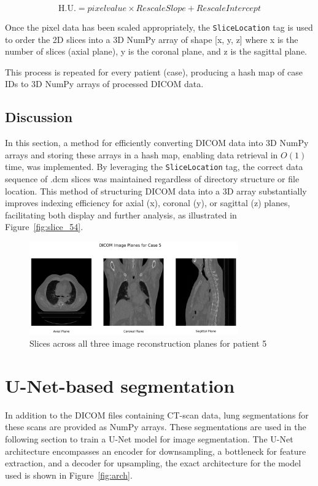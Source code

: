 \documentclass[12pt]{report}
\begin{document}
\begin{equation}
    \text{H.U.} = pixel value \times RescaleSlope + RescaleIntercept
    \label{eq:hu}
\end{equation}

Once the pixel data has been scaled appropriately, the \verb|SliceLocation| tag is used to order the 2D slices into a 3D NumPy array of shape [x, y, z] where x is the number of slices (axial plane), y is the coronal plane, and z is the sagittal plane.

This process is repeated for every patient (case), producing a hash map of case IDs to 3D NumPy arrays of processed DICOM data.


\section{Discussion}

In this section, a method for efficiently converting DICOM data into 3D NumPy arrays and storing these arrays in a hash map, enabling data retrieval in $O(1)$ time, was implemented. By leveraging the \texttt{SliceLocation} tag, the correct data sequence of .dcm slices was maintained regardless of directory structure or file location. This method of structuring DICOM data into a 3D array substantially improves indexing efficiency for axial (x), coronal (y), or sagittal (z) planes, facilitating both display and further analysis, as illustrated in Figure~\ref{fig:slice_54}.

\begin{figure}[ht]
    \centering
    \includegraphics[width=0.8\textwidth]{planes.png}
    \caption{Slices across all three image reconstruction planes for patient 5}
    \label{fig:planes}
\end{figure}

\chapter{U-Net-based segmentation}

In addition to the DICOM files containing CT-scan data, lung segmentations for these scans are provided as NumPy arrays. These segmentations are used in the following section to train a U-Net model for image segmentation.\cite{ronneberger_u-net_2015} The U-Net architecture encompasses an encoder for downsampling, a bottleneck for feature extraction, and a decoder for upsampling, the exact architecture for the model used is shown in Figure~\ref{fig:arch}.
\end{document}
